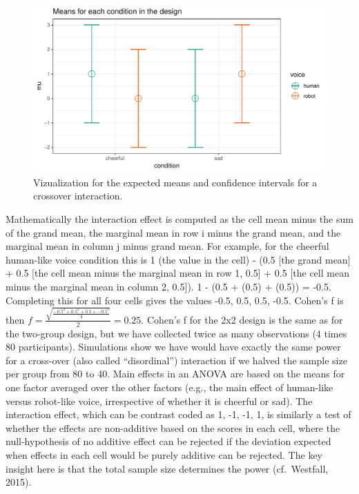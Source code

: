 \documentclass[,jou, draftfirst, a4paper,floatsintext]{apa6}
\begin{document}
\begin{figure}
\centering
\includegraphics{0.1_Simulation_Based_Power_Analysis_For_Factorial_ANOVA_Designs_files/figure-latex/mean-plot-1.pdf}
\caption{\label{fig:mean-plot}Vizualization for the expected means and confidence intervals for a crossover interaction.}
\end{figure}

Mathematically the interaction effect is computed as the cell mean minus the sum of the grand mean, the marginal mean in row i minus the grand mean, and the marginal mean in column j minus grand mean. For example, for the cheerful human-like voice condition this is 1 (the value in the cell) - (0.5 {[}the grand mean{]} + 0.5 {[}the cell mean minus the marginal mean in row 1, 0.5{]} + 0.5 {[}the cell mean minus the marginal mean in column 2, 0.5{]}). 1 - (0.5 + (0.5) + (0.5)) = -0.5.
Completing this for all four cells gives the values -0.5, 0.5, 0.5, -0.5.
Cohen's f is then \(f = \frac { \sqrt { \frac { -0.5^2 + 0.5^2 + 0.5 + -0.5^2 } { 4 } }}{ 2 } = 0.25\).
Cohen's f for the 2x2 design is the same as for the two-group design, but we have collected twice as many observations (4 times 80 participants).
Simulations show we have would have exactly the same power for a cross-over (also called \enquote{disordinal}) interaction if we halved the sample size per group from 80 to 40.
Main effects in an ANOVA are based on the means for one factor averaged over the other factors (e.g., the main effect of human-like versus robot-like voice, irrespective of whether it is cheerful or sad).
The interaction effect, which can be contrast coded as 1, -1, -1, 1, is similarly a test of whether the effects are non-additive based on the scores in each cell, where the null-hypothesis of no additive effect can be rejected if the deviation expected when effects in each cell would be purely additive can be rejected.
The key insight here is that the total sample size determines the power (cf.~Westfall, 2015).
\end{document}
